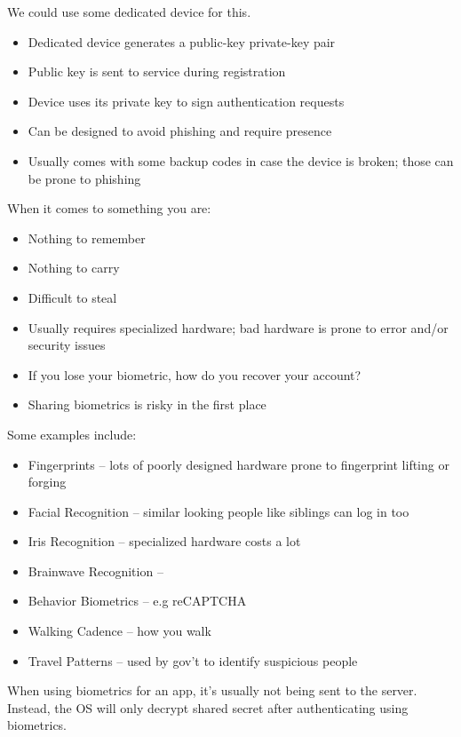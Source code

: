 \documentclass[12pt]{report}
\begin{document}
We could use some dedicated device for this.
\begin{itemize}[noitemsep]
    \item Dedicated device generates a public-key private-key pair
    \item Public key is sent to service during registration
    \item Device uses its private key to sign authentication requests
    \item Can be designed to avoid phishing and require presence
    \item Usually comes with some backup codes in case the device is broken; those can be prone to phishing
\end{itemize}

When it comes to something you are:
\begin{itemize}[noitemsep]
    \item Nothing to remember
    \item Nothing to carry
    \item Difficult to steal
    \item Usually requires specialized hardware; bad hardware is prone to error and/or security issues
    \item If you lose your biometric, how do you recover your account?
    \item Sharing biometrics is risky in the first place
\end{itemize}

Some examples include:
\begin{itemize}[noitemsep]
    \item Fingerprints -- lots of poorly designed hardware prone to fingerprint lifting or forging
    \item Facial Recognition -- similar looking people like siblings can log in too
    \item Iris Recognition -- specialized hardware costs a lot
    \item Brainwave Recognition --
    \item Behavior Biometrics -- e.g reCAPTCHA
    \item Walking Cadence -- how you walk
    \item Travel Patterns -- used by gov't to identify suspicious people
\end{itemize}

When using biometrics for an app, it's usually not being sent to the server. Instead, the OS will only decrypt shared secret after authenticating using biometrics.



\amzindex
\end{document}

